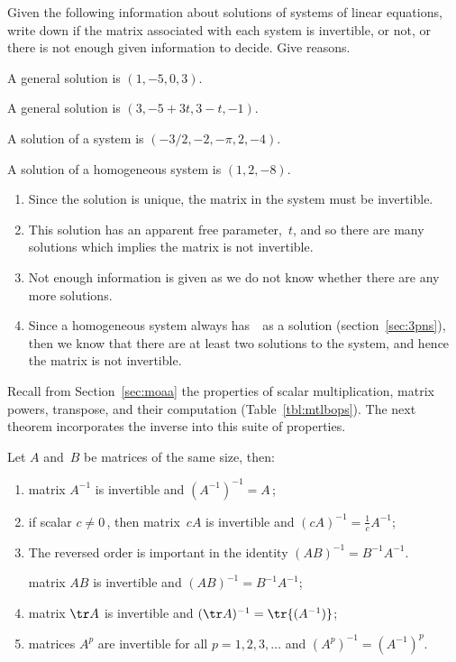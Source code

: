 \begin{example} \label{eg:}
Given the following information about solutions of systems of linear equations, write down if the matrix associated with each system is invertible, or not, or there is not enough given information to decide.  Give reasons.
\begin{parts}
\item A general solution is \((1,-5,0,3)\).
\item A general solution is \((3,-5+3t,3-t,-1)\).
\item A solution of a system is \((-3/2,-2,-\pi,2,-4)\).
\item A solution of a homogeneous system is \((1,2,-8)\).
\end{parts}
\begin{solution} 
\begin{enumerate}
\item Since the solution is unique, the matrix in the system must be invertible.
\item This solution has an apparent free parameter,~\(t\), and so there are many solutions which implies the matrix is not invertible.
\item Not enough information is given as we do not know whether there are any more solutions.
\item Since a homogeneous system always has~\ov\ as a solution (section~\ref{sec:3pns}), then we know that there are at least two solutions to the system, and hence the matrix is not invertible.
\end{enumerate}
\end{solution}
\end{example}




Recall from Section~\ref{sec:moaa} the properties of scalar multiplication, matrix powers, transpose, and their computation (Table~\ref{tbl:mtlbops}).
The next theorem incorporates the inverse into this suite of properties.


\begin{theorem} \label{thm:invprop} 
Let \(A\) and~\(B\) be  matrices of the same size, then:
\begin{enumerate}
\item\label{thm:invpropa}  matrix \(A^{-1}\) is invertible and \((A^{-1})^{-1}=A\)\,;
\item\label{thm:invpropb} if scalar \(c\neq0\)\,, then matrix~\(cA\) is invertible and \((cA)^{-1}=\frac1cA^{-1}\);
\item\label{thm:invpropc}\begin{aside}
The reversed order is important in the identity $(AB)^{-1}=B^{-1}A^{-1}$.
\end{aside} 
matrix \(AB\) is invertible and \((AB)^{-1}=B^{-1}A^{-1}\);
\item\label{thm:invpropd} matrix \(\tr A\) is invertible and \((\tr A)^{-1}=\tr{(A^{-1})}\);
\item\label{thm:invprope} matrices \(A^p\) are invertible for all \(p=1,2,3,\ldots\) and \((A^p)^{-1}=(A^{-1})^p\).
\end{enumerate}
\end{theorem}


